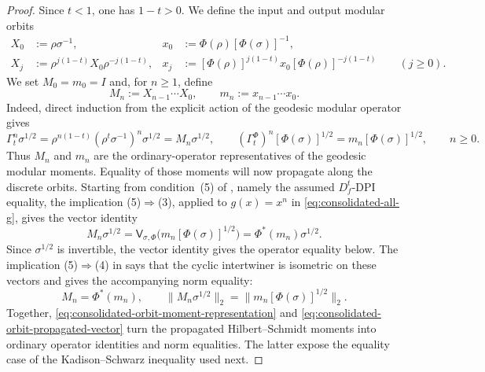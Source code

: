 \documentclass[11pt]{article}
\theoremstyle{remark}
\newcommand{\1}{\mathbbm{1}}
\begin{document}
\begin{proof}
Since $t<1$, one has $1-t>0$.  We define the input and output modular orbits
\begin{align*}
 X_0&:=\rho\sigma^{-1},&
 x_0&:=\Phi(\rho)[\Phi(\sigma)]^{-1},\\
 X_j&:=\rho^{j(1-t)}X_0\rho^{-j(1-t)},&
 x_j&:=[\Phi(\rho)]^{j(1-t)}x_0
       [\Phi(\rho)]^{-j(1-t)}\qquad(j\geq0).
\end{align*}
We set $M_0=m_0=I$ and, for $n\geq1$, define
\begin{equation}
 M_n:=X_{n-1}\cdots X_0,\qquad
 m_n:=x_{n-1}\cdots x_0.
\end{equation}
Indeed, direct induction from the explicit action of the geodesic
modular operator gives
\begin{equation}
 \Gamma_t^n\sigma^{1/2}
 =\rho^{n(1-t)}(\rho^t\sigma^{-1})^n\sigma^{1/2}
 =M_n\sigma^{1/2},\qquad
 (\Gamma_t^\Phi)^n[\Phi(\sigma)]^{1/2}
 =m_n[\Phi(\sigma)]^{1/2},
 \qquad n\geq0.
 \label{eq:consolidated-orbit-moment-representation}
\end{equation}
Thus $M_n$ and $m_n$ are the ordinary-operator representatives of the
geodesic modular moments.  Equality of those moments will now
propagate along the discrete orbits.  Starting from condition~\textup{(5)}
of , namely the assumed
$D_f^t$-DPI equality, the implication
\textup{(5)}$\Rightarrow$\textup{(3)}, applied to $g(x)=x^n$ in
\eqref{eq:consolidated-all-g}, gives the vector identity
\begin{equation}
 M_n\sigma^{1/2}
 =\mathsf V_{\sigma,\Phi}
   \bigl(m_n[\Phi(\sigma)]^{1/2}\bigr)
 =\Phi^*(m_n)\sigma^{1/2}.
 \label{eq:consolidated-orbit-propagated-vector}
\end{equation}
Since $\sigma^{1/2}$ is invertible, the vector identity gives the
operator equality below.  The implication
\textup{(5)}$\Rightarrow$\textup{(4)} in
 says that the cyclic
intertwiner is isometric on these vectors and gives the accompanying
norm equality:
\begin{equation}
 M_n=\Phi^*(m_n),\qquad
 \lVert M_n\sigma^{1/2}\rVert_2
 =\lVert m_n[\Phi(\sigma)]^{1/2}\rVert_2.
 \label{eq:norm_identity_Petz}
\end{equation}
Together, \eqref{eq:consolidated-orbit-moment-representation} and
\eqref{eq:consolidated-orbit-propagated-vector} turn the propagated
Hilbert--Schmidt moments into ordinary operator identities and norm
equalities.  The latter expose the equality case of the
Kadison--Schwarz inequality used next.


\end{proof}
\end{document}

